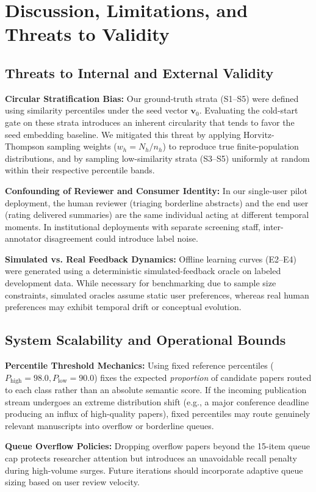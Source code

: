 \section{Discussion, Limitations, and Threats to Validity}
\label{sec:discussion}

\subsection{Threats to Internal and External Validity}
\label{sec:threats_validity}

\noindent\textbf{Circular Stratification Bias:} Our ground-truth strata (S1--S5) were defined using similarity percentiles under the seed vector $\mathbf{v}_0$. Evaluating the cold-start gate on these strata introduces an inherent circularity that tends to favor the seed embedding baseline. We mitigated this threat by applying Horvitz-Thompson sampling weights ($w_h = N_h/n_h$) to reproduce true finite-population distributions, and by sampling low-similarity strata (S3--S5) uniformly at random within their respective percentile bands.

\noindent\textbf{Confounding of Reviewer and Consumer Identity:} In our single-user pilot deployment, the human reviewer (triaging borderline abstracts) and the end user (rating delivered summaries) are the same individual acting at different temporal moments. In institutional deployments with separate screening staff, inter-annotator disagreement could introduce label noise.

\noindent\textbf{Simulated vs. Real Feedback Dynamics:} Offline learning curves (E2--E4) were generated using a deterministic simulated-feedback oracle on labeled development data. While necessary for benchmarking due to sample size constraints, simulated oracles assume static user preferences, whereas real human preferences may exhibit temporal drift or conceptual evolution.

\subsection{System Scalability and Operational Bounds}
\label{sec:scalability}

\noindent\textbf{Percentile Threshold Mechanics:} Using fixed reference percentiles ($P_{\text{high}}=98.0, P_{\text{low}}=90.0$) fixes the expected \textit{proportion} of candidate papers routed to each class rather than an absolute semantic score. If the incoming publication stream undergoes an extreme distribution shift (e.g., a major conference deadline producing an influx of high-quality papers), fixed percentiles may route genuinely relevant manuscripts into overflow or borderline queues.

\noindent\textbf{Queue Overflow Policies:} Dropping overflow papers beyond the 15-item queue cap protects researcher attention but introduces an unavoidable recall penalty during high-volume surges. Future iterations should incorporate adaptive queue sizing based on user review velocity.
